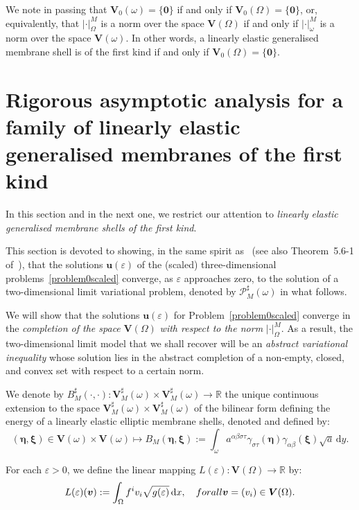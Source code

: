 \documentclass{amsart}
\def\dd{\, \mathrm{d}}
\begin{document}
We note in passing that $\bm{V}_0(\omega) =\{\bm{0}\}$ if and only if $\bm{V}_0(\Omega)=\{\bm{0}\}$, or, equivalently, that $|\cdot|_\Omega^M$ is a norm over the space $\bm{V}(\Omega)$ if and only if $|\cdot|_\omega^M$ is a norm over the space $\bm{V}(\omega)$. In other words, a linearly elastic generalised membrane shell is of the first kind if and only if $\bm{V}_0(\Omega)=\{\bm{0}\}$.

\section{Rigorous asymptotic analysis for a family of linearly elastic generalised membranes of the first kind}
\label{Sec:4}

In this section and in the next one, we restrict our attention to \emph{linearly elastic generalised membrane shells of the first kind}.

This section is devoted to showing, in the same spirit as~\cite{CiaLods1996d} (see also Theorem~5.6-1 of~\cite{Ciarlet2000}), that the solutions $\bm{u}(\varepsilon)$ of the (scaled) three-dimensional problems~\ref{problem0scaled} converge, as $\varepsilon$ approaches zero, to the solution of a two-dimensional limit variational problem, denoted by $\mathcal{P}_M^\sharp(\omega)$ in what follows.

We will show that the solutions $\bm{u}(\varepsilon)$ for Problem~\ref{problem0scaled} converge in the \emph{completion of the space} $\bm{V}(\Omega)$ \emph{with respect to the norm} $|\cdot|_\Omega^M$. As a result, the two-dimensional limit model that we shall recover will be an \emph{abstract variational inequality} whose solution lies in the abstract completion of a non-empty, closed, and convex set with respect to a certain norm.

We denote by $B_M^\sharp(\cdot,\cdot):\bm{V}_M^\sharp(\omega) \times \bm{V}_M^\sharp(\omega) \to \mathbb{R}$ the unique continuous extension to the space $\bm{V}_M^\sharp(\omega) \times \bm{V}_M^\sharp(\omega)$ of the bilinear form defining the energy of a linearly elastic elliptic membrane shells, denoted and defined by:
\begin{equation*}
(\bm{\eta},\bm{\xi}) \in \bm{V}(\omega) \times \bm{V}(\omega) \mapsto B_M(\bm{\eta},\bm{\xi}):=
\int_{\omega} a^{\alpha\beta\sigma\tau} \gamma_{\sigma\tau}(\bm{\eta}) \gamma_{\alpha\beta}(\bm{\xi}) \sqrt{a} \dd y.
\end{equation*}

For each $\varepsilon>0$, we define the linear mapping $L(\varepsilon):\bm{V}(\Omega) \to \mathbb{R}$ by:
\begin{equation*}
	L(\varepsilon)(\bm{v}):=\int_{\Omega} f^i v_i \sqrt{g(\varepsilon)} \dd x,\quad\textup{ for all }\bm{v}=(v_i)\in \bm{V}(\Omega).
\end{equation*}
\end{document}
